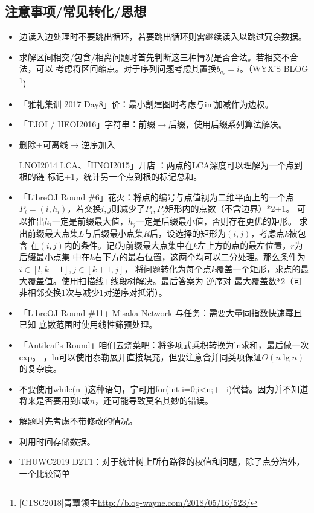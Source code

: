 \subsection{注意事项/常见转化/思想}
\begin{itemize}
	\item 边读入边处理时不要跳出循环，若要跳出循环则需继续读入以跳过冗余数据。
	\item 求解区间相交/包含/相离问题时首先判断这三种情况是否合法。若相交不合法，可以
	      考虑将区间缩点。对于序列问题考虑其置换$b_{a_i}=i$。（WYX'S BLOG
	      \footnote{[CTSC2018]青蕈领主\url{http://blog-wayne.com/2018/05/16/523/}}）
	\item 「雅礼集训 2017 Day8」价：最小割建图时考虑与inf加减作为边权。
	\item 「TJOI / HEOI2016」字符串：前缀$\rightarrow$后缀，使用后缀系列算法解决。
	\item 删除+可离线$\rightarrow$逆序加入
	\item [LNOI2014] LCA、「HNOI2015」开店 ：两点的LCA深度可以理解为一个点到根的链
	      标记+1，统计另一个点到根的标记总和。
	\item 「LibreOJ Round \#6」花火：将点的编号与点值视为二维平面上的一个点
	      $P_i=(i,h_i)$，若交换$i,j$则减少了$P_i,P_j$矩形内的点数（不含边界）*2+1。
	      可以推出$h_i$一定是前缀最大值，$h_j$一定是后缀最小值，否则存在更优的矩形。
	      求出前缀最大点集$L$与后缀最小点集$R$后，设选择的矩形为$(i,j)$，考虑点$k$被包含
	      在$(i,j)$内的条件。记$l$为前缀最大点集中在$k$左上方的点的最左位置，$r$为后缀最小点集
	      中在$k$右下方的最右位置，这两个均可以二分处理。那么条件为$i\in [l,k-1],j\in [k+1,j]$，
	      将问题转化为每个点$k$覆盖一个矩形，求点的最大覆盖值。使用扫描线+线段树解决。最后答案为
	      逆序对-最大覆盖数*2（可非相邻交换1次与减少1对逆序对抵消）。
	\item 「LibreOJ Round \#11」Misaka Network 与任务：需要大量同指数快速幂且已知
	      底数范围时使用线性筛预处理。
	\item 「Antileaf's Round」咱们去烧菜吧：将多项式乘积转换为ln求和，最后做一次exp。
	      ，ln可以使用泰勒展开直接填充，但要注意合并同类项保证$O(n\lg n)$的复杂度。
	\item 不要使用while(n--)这种语句，宁可用for(int i=0;i<n;++i)代替。因为并不知道
	      将来是否要用到$i$或$n$，还可能导致莫名其妙的错误。
	\item 解题时先考虑不带修改的情况。
	\item 利用时间存储数据。
	\item THUWC2019 D2T1：对于统计树上所有路径的权值和问题，除了点分治外，一个比较简单

\end{itemize}
